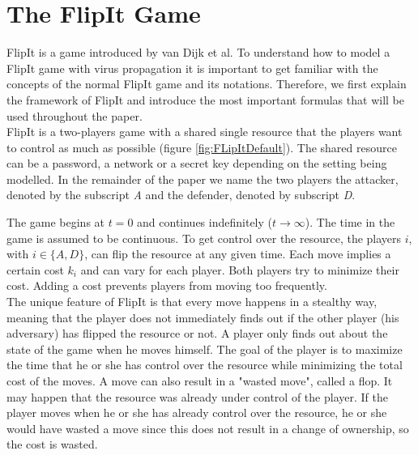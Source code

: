 \section{The FlipIt Game}
\label{cha1:FlipItGame}
FlipIt is a game introduced by van Dijk et al. To understand how to model a FlipIt game with virus propagation it is important to get familiar with the concepts of the normal FlipIt game and its notations.  Therefore, we first explain the framework of FlipIt and introduce the most important formulas that will be used throughout the paper. \\

FlipIt is a two-players game with a shared single resource that the players want to control as much as possible (figure \ref{fig:FLipItDefault}). The shared resource can be a password, a network or a secret key depending on the setting being modelled. In the remainder of the paper we name the two players the attacker, denoted by the subscript \textit{A} and the defender, denoted by subscript \textit{D}. 

The game begins at $t=0$ and continues indefinitely ($t \rightarrow \infty $). The time in the game is assumed to be continuous. To get control over the resource, the players $i$, with $i \in \{A,D\}$, can flip the resource at any given time. 
Each move implies a certain cost $k_{i}$ and can vary for each player. Both players try to minimize their cost. Adding a cost prevents players from moving too frequently. \\

The unique feature of FlipIt is that every move happens in a stealthy way, meaning that the player does not immediately finds out if the other player (his adversary) has flipped the resource or not. A player only finds out about the state of the game when he moves himself. The goal of the player is to maximize the time that he or she has control over the resource while minimizing the total cost of the moves. A move can also result in a "wasted move", called a flop. It may happen that the resource was already under control of the player. If the player moves when he or she has already control over the resource, he or she would have wasted a move since this does not result in a change of ownership, so the cost is wasted. \\



